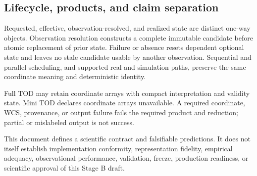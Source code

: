 \subsection{Lifecycle, products, and claim separation}

Requested, effective, observation-resolved, and realized state are distinct
one-way objects.  Observation resolution constructs a complete immutable
candidate before atomic replacement of prior state.  Failure or absence resets
dependent optional state and leaves no stale candidate usable by another
observation.  Sequential and parallel scheduling, and supported real and
simulation paths, preserve the same coordinate meaning and deterministic
identity.

Full TOD may retain coordinate arrays with compact interpretation and validity
state.  Mini TOD declares coordinate arrays unavailable.  A required
coordinate, WCS, provenance, or output failure fails the required product and
reduction; partial or mislabeled output is not success.

This document defines a scientific contract and falsifiable predictions.  It
does not itself establish implementation conformity, representation fidelity,
empirical adequacy, observational performance, validation, freeze, production
readiness, or scientific approval of this Stage B draft.
